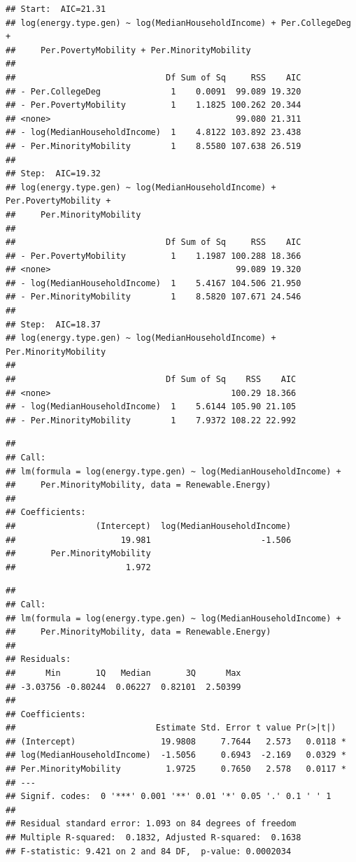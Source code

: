 \documentclass[
  12pt,
]{article}
\begin{document}
\begin{verbatim}
## Start:  AIC=21.31
## log(energy.type.gen) ~ log(MedianHouseholdIncome) + Per.CollegeDeg + 
##     Per.PovertyMobility + Per.MinorityMobility
## 
##                              Df Sum of Sq     RSS    AIC
## - Per.CollegeDeg              1    0.0091  99.089 19.320
## - Per.PovertyMobility         1    1.1825 100.262 20.344
## <none>                                     99.080 21.311
## - log(MedianHouseholdIncome)  1    4.8122 103.892 23.438
## - Per.MinorityMobility        1    8.5580 107.638 26.519
## 
## Step:  AIC=19.32
## log(energy.type.gen) ~ log(MedianHouseholdIncome) + Per.PovertyMobility + 
##     Per.MinorityMobility
## 
##                              Df Sum of Sq     RSS    AIC
## - Per.PovertyMobility         1    1.1987 100.288 18.366
## <none>                                     99.089 19.320
## - log(MedianHouseholdIncome)  1    5.4167 104.506 21.950
## - Per.MinorityMobility        1    8.5820 107.671 24.546
## 
## Step:  AIC=18.37
## log(energy.type.gen) ~ log(MedianHouseholdIncome) + Per.MinorityMobility
## 
##                              Df Sum of Sq    RSS    AIC
## <none>                                    100.29 18.366
## - log(MedianHouseholdIncome)  1    5.6144 105.90 21.105
## - Per.MinorityMobility        1    7.9372 108.22 22.992
\end{verbatim}

\begin{verbatim}
## 
## Call:
## lm(formula = log(energy.type.gen) ~ log(MedianHouseholdIncome) + 
##     Per.MinorityMobility, data = Renewable.Energy)
## 
## Coefficients:
##                (Intercept)  log(MedianHouseholdIncome)  
##                     19.981                      -1.506  
##       Per.MinorityMobility  
##                      1.972
\end{verbatim}

\begin{verbatim}
## 
## Call:
## lm(formula = log(energy.type.gen) ~ log(MedianHouseholdIncome) + 
##     Per.MinorityMobility, data = Renewable.Energy)
## 
## Residuals:
##      Min       1Q   Median       3Q      Max 
## -3.03756 -0.80244  0.06227  0.82101  2.50399 
## 
## Coefficients:
##                            Estimate Std. Error t value Pr(>|t|)  
## (Intercept)                 19.9808     7.7644   2.573   0.0118 *
## log(MedianHouseholdIncome)  -1.5056     0.6943  -2.169   0.0329 *
## Per.MinorityMobility         1.9725     0.7650   2.578   0.0117 *
## ---
## Signif. codes:  0 '***' 0.001 '**' 0.01 '*' 0.05 '.' 0.1 ' ' 1
## 
## Residual standard error: 1.093 on 84 degrees of freedom
## Multiple R-squared:  0.1832, Adjusted R-squared:  0.1638 
## F-statistic: 9.421 on 2 and 84 DF,  p-value: 0.0002034
\end{verbatim}
\end{document}
